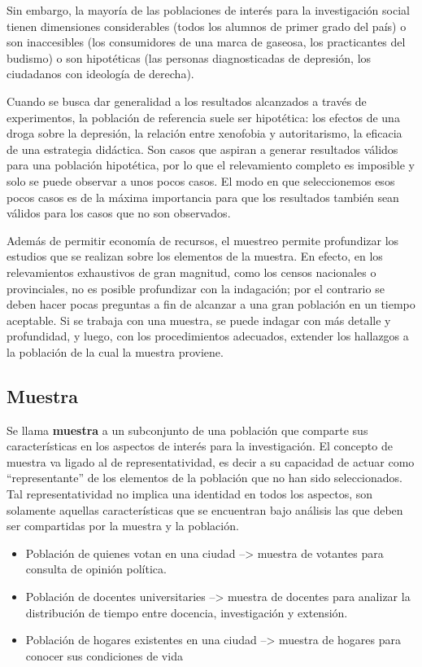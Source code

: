 \documentclass[]{book}
\providecommand{\tightlist}{%
  \setlength{\itemsep}{0pt}\setlength{\parskip}{0pt}}
\begin{document}
Sin embargo, la mayoría de las poblaciones de interés para la
investigación social tienen dimensiones considerables (todos los alumnos de primer grado del país) o son inaccesibles (los consumidores de una marca de gaseosa, los practicantes del budismo) o son hipotéticas (las personas diagnosticadas de depresión, los ciudadanos con ideología de derecha).

Cuando se busca dar generalidad a los resultados alcanzados a través de experimentos, la población de referencia suele ser hipotética: los
efectos de una droga sobre la depresión, la relación entre xenofobia y autoritarismo, la eficacia de una estrategia didáctica. Son casos que aspiran a generar
resultados válidos para una población hipotética, por lo que el
relevamiento completo es imposible y solo se puede observar a unos pocos
casos. El modo en que seleccionemos esos pocos casos es de la máxima
importancia para que los resultados también sean válidos para los casos
que no son observados.

Además de permitir economía de recursos, el muestreo permite profundizar
los estudios que se realizan sobre los elementos de la muestra. En
efecto, en los relevamientos exhaustivos de gran magnitud, como los
censos nacionales o provinciales, no es posible profundizar con la
indagación; por el contrario se deben hacer pocas preguntas a fin de
alcanzar a una gran población en un tiempo aceptable. Si se trabaja con
una muestra, se puede indagar con más detalle y profundidad, y luego,
con los procedimientos adecuados, extender los hallazgos a la población
de la cual la muestra proviene.

\hypertarget{muestra}{%
\subsection{Muestra}\label{muestra}}

Se llama \textbf{muestra} a un subconjunto de una población que comparte sus
características en los aspectos de interés para la investigación. El
concepto de muestra va ligado al de representatividad, es decir a su
capacidad de actuar como ``representante'' de los elementos de la
población que no han sido seleccionados. Tal representatividad no
implica una identidad en todos los aspectos, son solamente aquellas
características que se encuentran bajo análisis las que deben ser
compartidas por la muestra y la población.

\begin{itemize}
\tightlist
\item
  Población de quienes votan en una ciudad --\textgreater{} muestra de votantes para consulta de opinión política.
\item
  Población de docentes universitaries --\textgreater{} muestra de docentes para analizar la distribución de tiempo entre docencia, investigación y extensión.
\item
  Población de hogares existentes en una ciudad --\textgreater{} muestra de hogares para conocer sus condiciones de vida
\end{itemize}
\end{document}
